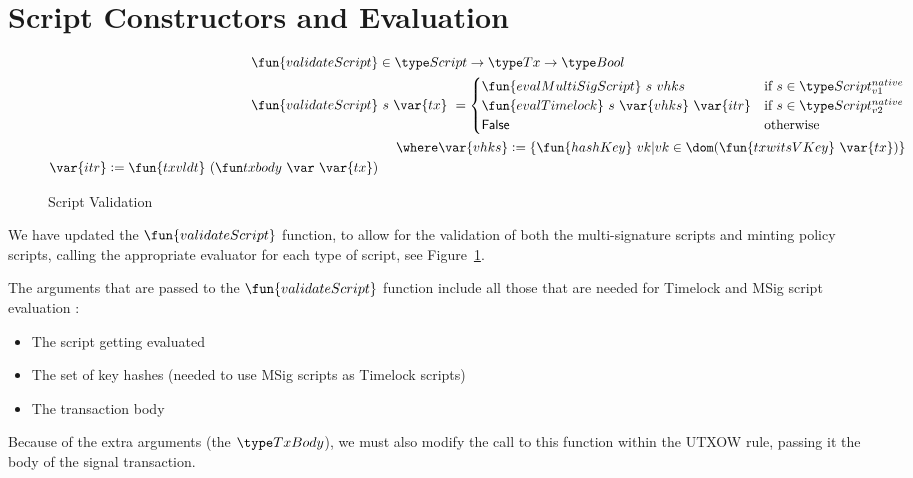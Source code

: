 \section{Script Constructors and Evaluation}
\label{sec:timelock-lang}


\begin{figure}[htb]
  \begin{align*}
    \fun{validateScript} & \in\Script\to\Tx\to\Bool \\
    \fun{validateScript} & ~s~\var{tx}~=
                           \begin{cases}
                             \fun{evalMultiSigScript}~s~vhks & \text{if}~s \in\ScriptNI \\
                             \fun{evalTimelock}~s~\var{vhks} ~\var{itr} & \text{if}~s \in\Timelock \\
                             \mathsf{False} & \text{otherwise}
                           \end{cases} \\
                         & ~~~~\where \var{vhks}\leteq \{\fun{hashKey}~vk \vert
                           vk \in \dom(\fun{txwitsVKey}~\var{tx})\} \\
                           \var{itr} \leteq \fun{txvldt}~ (\txbody~ \var{tx})
  \end{align*}
  \caption{Script Validation}
  \label{fig:functions-validate}
\end{figure}

We have updated the
$\fun{validateScript}$ function, to allow for the validation of both the
multi-signature scripts and minting policy scripts, calling the appropriate
evaluator for each type of script, see Figure~\ref{fig:functions-validate}.

The arguments that are passed to the $\fun{validateScript}$ function include all those
that are needed for Timelock and MSig script evaluation :

\begin{itemize}
\item The script getting evaluated
\item The set of key hashes (needed to use MSig scripts as Timelock scripts)
\item The transaction body
\end{itemize}

Because of the extra arguments
(the $\TxBody$), we must also modify the call to this function
within the UTXOW rule, passing it the body of the signal transaction.

